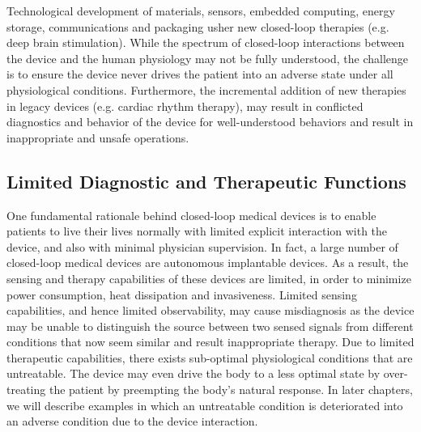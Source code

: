 Technological development of materials, sensors, embedded computing, energy storage, communications and packaging usher new closed-loop therapies (e.g. deep brain stimulation). While the spectrum of closed-loop interactions between the device and the human physiology may not be fully understood, the challenge is to ensure the device never drives the patient into an adverse state under all physiological conditions. Furthermore, the incremental addition of new therapies in legacy devices (e.g. cardiac rhythm therapy), may result in conflicted diagnostics and behavior of the device for well-understood behaviors and result in inappropriate and unsafe operations. 

\subsection{Limited Diagnostic and Therapeutic Functions}
One fundamental rationale behind closed-loop medical devices is to enable patients to live their  lives normally with limited explicit interaction with the device, and also with minimal physician supervision. In fact, a large number of closed-loop medical devices are autonomous implantable devices. As a result, the sensing and therapy capabilities of these devices are limited, in order to minimize power consumption, heat dissipation and invasiveness. Limited sensing capabilities, and hence limited observability, may cause misdiagnosis as the device may be unable to distinguish the source between two sensed signals from different conditions that now seem similar and result inappropriate therapy. Due to limited therapeutic capabilities, there exists sub-optimal physiological conditions that are untreatable. The device may even drive the body to a less optimal state by over-treating the patient by preempting the body's natural response. In later chapters, we will describe examples in which an untreatable condition is deteriorated into an adverse condition due to the device interaction.

